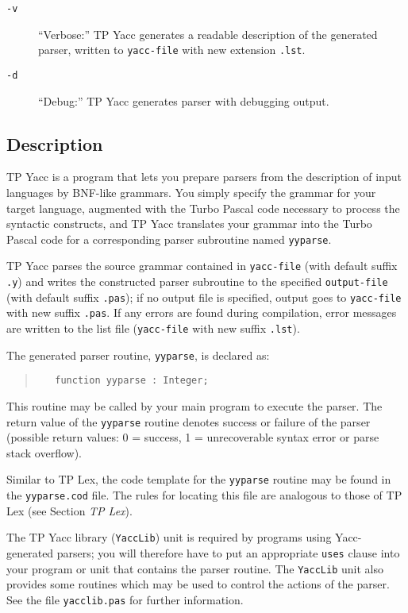 \begin{description}
   \item[\verb"-v"]
      ``Verbose:'' TP Yacc generates a readable description of the generated
      parser, written to \verb"yacc-file" with new extension \verb".lst".
   \item[\verb"-d"]
      ``Debug:'' TP Yacc generates parser with debugging output.
\end{description}

\subsection{Description}

TP Yacc is a program that lets you prepare parsers from the description
of input languages by BNF-like grammars. You simply specify the grammar
for your target language, augmented with the Turbo Pascal code necessary
to process the syntactic constructs, and TP Yacc translates your grammar
into the Turbo Pascal code for a corresponding parser subroutine named
\verb"yyparse".

TP Yacc parses the source grammar contained in \verb"yacc-file" (with default
suffix \verb".y") and writes the constructed parser subroutine to the
specified \verb"output-file" (with default suffix \verb".pas"); if no output
file is specified, output goes to \verb"yacc-file" with new suffix
\verb".pas". If any errors are found during compilation, error messages are
written to the list file (\verb"yacc-file" with new suffix \verb".lst").

The generated parser routine, \verb"yyparse", is declared as:

\begin{quote}\begin{verbatim}
   function yyparse : Integer;
\end{verbatim}\end{quote}

This routine may be called by your main program to execute the parser.
The return value of the \verb"yyparse" routine denotes success or failure of
the parser (possible return values: 0 = success, 1 = unrecoverable syntax
error or parse stack overflow).

Similar to TP Lex, the code template for the \verb"yyparse" routine may be
found in the \verb"yyparse.cod" file. The rules for locating this file are
analogous to those of TP Lex (see Section {\em TP Lex\/}).

The TP Yacc library (\verb"YaccLib") unit is required by programs using Yacc-
generated parsers; you will therefore have to put an appropriate \verb"uses"
clause into your program or unit that contains the parser routine. The
\verb"YaccLib" unit also provides some routines which may be used to control
the actions of the parser. See the file \verb"yacclib.pas" for further
information.

